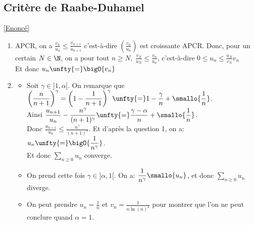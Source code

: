 \documentclass{book}
\begin{document}
	\subsection{Critère de Raabe-Duhamel }
	\label{sec:critere-de-raabe-duhamel-etoile2}
	\textcolor{blue}{\hyperref[Critère de Raabe-Duhamel]{[Enoncé]}}\\
	\begin{enumerate}
		\item APCR, on a $\displaystyle\frac{v_{n}}{u_n}\leq\frac{v_{n+1}}{u_{n+1}}$ c'est-à-dire $\left(\displaystyle\frac{v_{n}}{u_n}\right)$ est croissante APCR. Donc, pour un certain $N\in\N$, on a pour tout $n\geq N, \; \displaystyle\frac{v_{N}}{u_N}\leq\frac{v_{n}}{u_n}$, c'est-à-dire $0\leq u_n\leq\displaystyle\frac{u_N}{v_N}v_n$
		\\Et donc $u_n\unfty{=}\bigO{v_n}$
		\item \begin{itemize}
			\item Soit $\gamma\in]1,\alpha[$. On remarque que $\displaystyle\left(\frac{n}{n+1}\right)
			^\gamma=\left(1-\frac{1}{n+1}\right)^\gamma\unfty{=}1-\frac{\gamma}{n}+\smallo{\frac{1}{n}}$.
			\\Ainsi $\displaystyle\frac{u_{n+1}}{u_n}-\frac{n^{\gamma}}{(n+1)^{\gamma}}\unfty{=}\frac{\gamma-\alpha}{n}+\smallo{\frac{1}{n}}$.
			\\Donc $\displaystyle\frac{u_{n+1}}{u_n}\leq\frac{n^{\gamma}}{(n+1)^{\gamma}}$. Et d'après la question 1, on a: $u_n\unfty{=}\bigO{\displaystyle\frac{1}{n^\gamma}}$.
			\\Et donc $\displaystyle\sum\limits_{n\geq 0}u_n$ converge.
			\item On prend cette fois $\gamma\in]\alpha,1[$. On a: $\displaystyle\frac{1}{n^{\gamma}}\smallo{u_n}$, et donc $\displaystyle\sum\limits_{n\geq 0}u_n$ diverge.
			\item On peut prendre $u_n=\displaystyle\frac{1}{n}$ et $v_n=\displaystyle\frac{1}{n\ln(n)^2}$ pour montrer que l'on ne peut conclure quand $\alpha=1$.
		\end{itemize}
	\end{enumerate}
	
\end{document}
